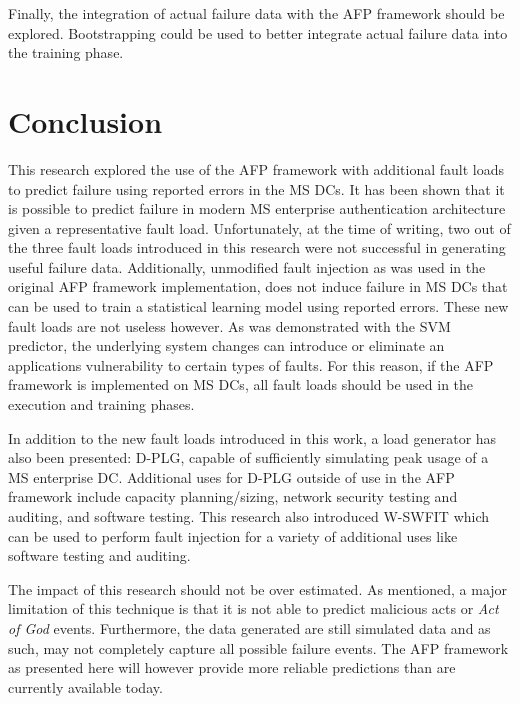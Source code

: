 Finally, the integration of actual failure data with the \ac{AFP} framework
should be explored.  Bootstrapping could be used to better integrate actual
failure data into the training phase. 

\section{Conclusion}
This research explored the use of the \ac{AFP} framework with additional fault
loads to predict failure using reported errors in the \ac{MS} \ac{DC}s.  It has
been shown that it is possible to predict failure in modern \ac{MS} enterprise
authentication architecture given a representative fault load.  Unfortunately,
at the time of writing, two out of the three fault loads introduced in this
research were not successful in generating useful failure data.  Additionally,
unmodified fault injection as was used in the original \ac{AFP} framework
implementation, does not induce failure in \ac{MS} \ac{DC}s that can be used to
train a statistical learning model using reported errors.  These new fault
loads are not useless however.  As was demonstrated with the \ac{SVM}
predictor, the underlying system changes can introduce or eliminate an
applications vulnerability to certain types of faults.  For this reason, if the
\ac{AFP} framework is implemented on \ac{MS} \ac{DC}s, all fault loads should
be used in the execution and training phases.

In addition to the new fault loads introduced in this work, a load generator
has also been presented:  \ac{D-PLG}, capable of sufficiently simulating peak
usage of a \ac{MS} enterprise \ac{DC}.  Additional uses for \ac{D-PLG} outside
of use in the \ac{AFP} framework include capacity planning/sizing, network
security testing and auditing, and software testing.  This research also
introduced \ac{W-SWFIT} which can be used to perform fault injection for a
variety of additional uses like software testing and auditing.

The impact of this research should not be over estimated.  As mentioned, a
major limitation of this technique is that it is not able to predict malicious
acts or \emph{Act of God} events.  Furthermore, the data generated are still
simulated data and as such, may not completely capture all possible failure
events.  The \ac{AFP} framework as presented here will however provide more
reliable predictions than are currently available today.

